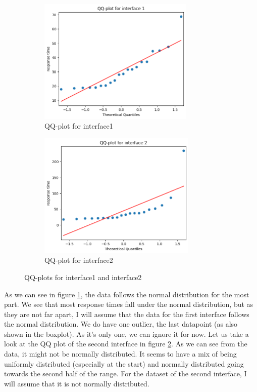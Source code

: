 \documentclass[a4paper]{article}
\begin{document}
\begin{figure}[H]
    \begin{subfigure}{0.5\textwidth}
\includegraphics[width=0.9\linewidth, height=6cm]{images/q1QQinterface1.png} 
\caption{QQ-plot for interface1}
\label{fig:q1QQ1}
\end{subfigure}
\begin{subfigure}{0.5\textwidth}
\includegraphics[width=0.9\linewidth, height=6cm]{images/q1QQinterface2.png}
\caption{QQ-plot for interface2}
\label{fig:q1QQ2}
\end{subfigure}
    \caption{QQ-plots for interface1 and interface2}
    \label{fig:enter-label}
\end{figure}
As we can see in figure \ref{fig:q1QQ1}, the data follows the normal distribution for the most part. We see that most response times fall under the normal distribution, but as they are not far apart, I will assume that the data for the first interface follows the normal distribution.
We do have one outlier, the last datapoint (as also shown in the boxplot). As it's only one, we can ignore it for now.
Let us take a look at the QQ plot of the second interface in figure \ref{fig:q1QQ2}. As we can see from the data, it might not be normally distributed. It seems to have a mix of being uniformly distributed (especially at the start) and normally distributed going towards the second half of the range. For the dataset of the second interface, I will assume that it is not normally distributed.
\end{document}
